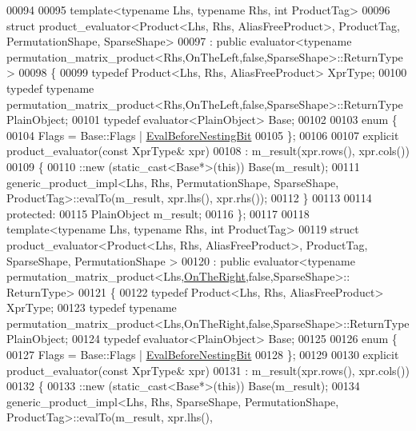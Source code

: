 \begin{DoxyCode}
00094 
00095 \textcolor{keyword}{template}<\textcolor{keyword}{typename} Lhs, \textcolor{keyword}{typename} Rhs, \textcolor{keywordtype}{int} ProductTag>
00096 \textcolor{keyword}{struct }product\_evaluator<Product<Lhs, Rhs, AliasFreeProduct>, ProductTag, PermutationShape, SparseShape>
00097   : \textcolor{keyword}{public} evaluator<typename permutation\_matrix\_product<Rhs,OnTheLeft,false,SparseShape>::ReturnType>
00098 \{
00099   \textcolor{keyword}{typedef} Product<Lhs, Rhs, AliasFreeProduct> XprType;
00100   \textcolor{keyword}{typedef} \textcolor{keyword}{typename} permutation\_matrix\_product<Rhs,OnTheLeft,false,SparseShape>::ReturnType PlainObject;
00101   \textcolor{keyword}{typedef} evaluator<PlainObject> Base;
00102 
00103   \textcolor{keyword}{enum} \{
00104     Flags = Base::Flags | \hyperlink{group__flags_gaa34e83bae46a8eeae4e69ebe3aaecbed}{EvalBeforeNestingBit}
00105   \};
00106 
00107   \textcolor{keyword}{explicit} product\_evaluator(\textcolor{keyword}{const} XprType& xpr)
00108     : m\_result(xpr.rows(), xpr.cols())
00109   \{
00110     ::new (static\_cast<Base*>(\textcolor{keyword}{this})) Base(m\_result);
00111     generic\_product\_impl<Lhs, Rhs, PermutationShape, SparseShape, ProductTag>::evalTo(m\_result, xpr.lhs(), 
      xpr.rhs());
00112   \}
00113 
00114 protected:
00115   PlainObject m\_result;
00116 \};
00117 
00118 template<typename Lhs, typename Rhs, \textcolor{keywordtype}{int} ProductTag>
00119 struct product\_evaluator<Product<Lhs, Rhs, AliasFreeProduct>, ProductTag, SparseShape, PermutationShape >
00120   : public evaluator<typename permutation\_matrix\_product<Lhs,\hyperlink{group__enums_ggac22de43beeac7a78b384f99bed5cee0ba99dc75d8e00b6c3a5bdc31940f47492b}{OnTheRight},false,SparseShape>::
      ReturnType>
00121 \{
00122   \textcolor{keyword}{typedef} Product<Lhs, Rhs, AliasFreeProduct> XprType;
00123   \textcolor{keyword}{typedef} \textcolor{keyword}{typename} permutation\_matrix\_product<Lhs,OnTheRight,false,SparseShape>::ReturnType PlainObject;
00124   \textcolor{keyword}{typedef} evaluator<PlainObject> Base;
00125 
00126   \textcolor{keyword}{enum} \{
00127     Flags = Base::Flags | \hyperlink{group__flags_gaa34e83bae46a8eeae4e69ebe3aaecbed}{EvalBeforeNestingBit}
00128   \};
00129 
00130   \textcolor{keyword}{explicit} product\_evaluator(\textcolor{keyword}{const} XprType& xpr)
00131     : m\_result(xpr.rows(), xpr.cols())
00132   \{
00133     ::new (static\_cast<Base*>(\textcolor{keyword}{this})) Base(m\_result);
00134     generic\_product\_impl<Lhs, Rhs, SparseShape, PermutationShape, ProductTag>::evalTo(m\_result, xpr.lhs(), 

\end{DoxyCode}
